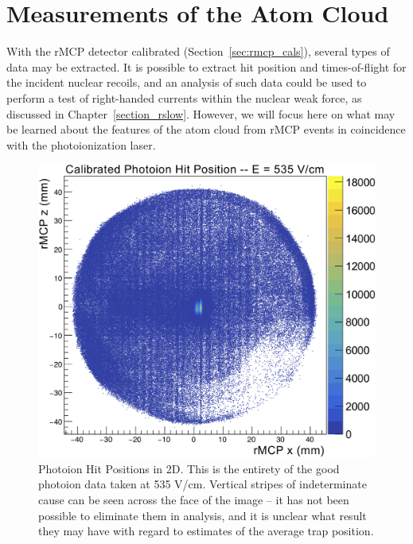 \section{Measurements of the Atom Cloud}
\label{sec:cloud_calibration}
With the rMCP detector calibrated (Section~\ref{sec:rmcp_cals}), several types of data may be extracted.  It is possible to extract hit position and times-of-flight for the incident nuclear recoils, and an analysis of such data could be used to perform a test of right-handed currents within the nuclear weak force, as discussed in Chapter~\ref{section_rslow}.  However, we will focus here on what may be learned about the features of the atom cloud from rMCP events in coincidence with the photoionization laser.~


\begin{figure}[h!tb]
	\centering
	\includegraphics[width=.999\linewidth]
	{Figures/rMCP_PI_2D_535.png}
	\caption[Photoion Hit Positions in 2D]{Photoion Hit Positions in 2D.  This is the entirety of the good photoion data taken at 535 V/cm.  Vertical stripes of indeterminate cause can be seen across the face of the image -- it has not been possible to eliminate them in analysis, and it is unclear what result they may have with regard to estimates of the average trap position.}	
	\label{fig:photoionhits_2D}
\end{figure}

